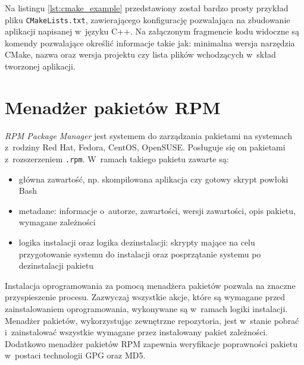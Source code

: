 Na listingu \ref{lst:cmake_example} przedstawiony został bardzo prosty przykład pliku \lstinline{CMakeLists.txt}, zawierającego konfigurację pozwalająca na zbudowanie aplikacji napisanej w~języku C++. Na załączonym fragmencie kodu widoczne są komendy pozwalające określić informacje takie jak: minimalna wersja narzędzia CMake, nazwa oraz wersja projektu czy lista plików wchodzących w~skład tworzonej aplikacji.



\section{Menadżer pakietów RPM}
\emph{RPM Package Manager} \cite{rpm} \cite{rpm_wiki} jest systemem do zarządzania pakietami na systemach z~rodziny Red Hat, Fedora, CentOS, OpenSUSE. Posługuje się on pakietami z~rozszerzeniem \lstinline{.rpm}. W~ramach takiego pakietu zawarte są:
\begin{itemize}
    \item główna zawartość, np. skompilowana aplikacja czy gotowy skrypt powłoki Bash \cite{bash}
    \item metadane: informacje o~autorze, zawartości, wersji zawartości, opis pakietu, wymagane zależności
    \item logika instalacji oraz logika dezinstalacji: skrypty mające na celu przygotowanie systemu do instalacji oraz posprzątanie systemu po dezinstalacji pakietu
\end{itemize}

Instalacja oprogramowania za pomocą menadżera pakietów pozwala na znaczne przyspieszenie procesu. Zazwyczaj wszystkie akcje, które są wymagane przed zainstalowaniem oprogramowania, wykonywane są w~ramach logiki instalacji. Menadżer pakietów, wykorzystując zewnętrzne repozytoria, jest w~stanie pobrać i~zainstalować wszystkie wymagane przez instalowany pakiet zależności. Dodatkowo menadżer pakietów RPM zapewnia weryfikacje poprawności pakietu w~postaci technologii GPG oraz MD5.

